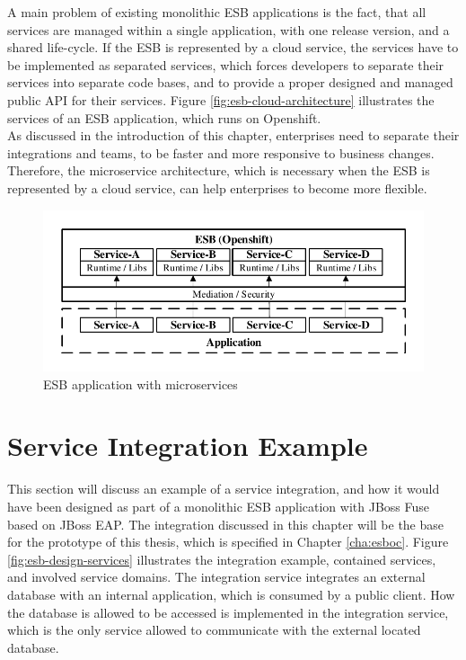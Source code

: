 A main problem of existing monolithic ESB applications is the fact, that all services are managed within a single application, with one release version, and a shared life-cycle. If the ESB is represented by a cloud service, the services have to be implemented as separated services, which forces developers to separate their services into separate code bases, and to provide a proper designed and managed public API for their services. Figure \vref{fig:esb-cloud-architecture} illustrates the services of an ESB application, which runs on Openshift. \\

As discussed in the introduction of this chapter, enterprises need to separate their integrations and teams, to be faster and more responsive to business changes. Therefore, the microservice architecture, which is necessary when the ESB is represented by a cloud service, can help enterprises to become more flexible.

\begin{figure}[htbp]
	\centering
	\includegraphics[scale=1]{images/esb-cloud-architecture.pdf}
	\caption{ESB application with microservices}
	\label{fig:esb-cloud-architecture}
\end{figure} 

\section{Service Integration Example}
\label{sec:esb-integration-example}
This section will discuss an example of a service integration, and how it would have been designed as part of a monolithic ESB application with JBoss Fuse based on JBoss EAP. The integration discussed in this chapter will be the base for the prototype of this thesis, which is specified in Chapter \vref{cha:esboc}. Figure \vref{fig:esb-design-services} illustrates the integration example, contained services, and involved service domains. The integration service integrates an external database with an internal application, which is consumed by a public client. How the database is allowed to be accessed is implemented in the integration service, which is the only service allowed to communicate with the external located database.

